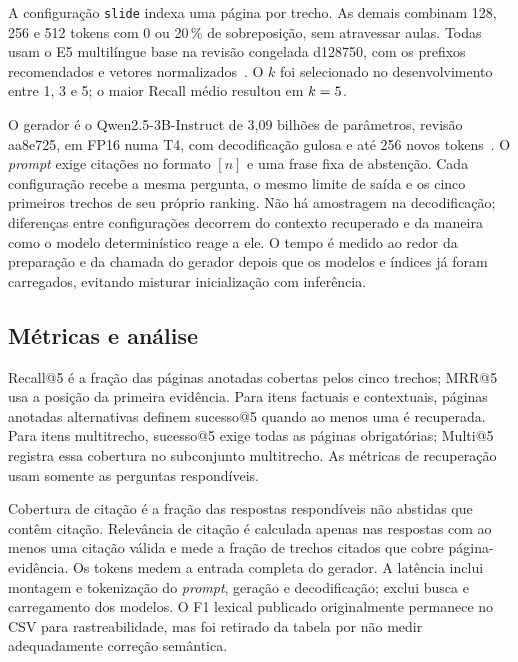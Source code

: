 \documentclass[conference]{IEEEtran}
\begin{document}
A configuração \texttt{slide} indexa uma página por trecho.
As demais combinam 128, 256 e 512 tokens com 0 ou 20\,\% de sobreposição, sem atravessar aulas.
Todas usam o E5 multilíngue base na revisão congelada d128750, com os prefixos recomendados e vetores normalizados~\cite{e5modelcard}.
O $k$ foi selecionado no desenvolvimento entre 1, 3 e 5; o maior Recall médio resultou em $k=5$.

O gerador é o Qwen2.5-3B-Instruct de 3,09 bilhões de parâmetros, revisão aa8e725, em FP16 numa T4, com decodificação gulosa e até 256 novos tokens~\cite{qwen2025qwen25,qwenmodelcard}.
O \textit{prompt} exige citações no formato $[n]$ e uma frase fixa de abstenção.
Cada configuração recebe a mesma pergunta, o mesmo limite de saída e os cinco primeiros trechos de seu próprio ranking.
Não há amostragem na decodificação; diferenças entre configurações decorrem do contexto recuperado e da maneira como o modelo determinístico reage a ele.
O tempo é medido ao redor da preparação e da chamada do gerador depois que os modelos e índices já foram carregados, evitando misturar inicialização com inferência.

\subsection{Métricas e análise}
Recall@5 é a fração das páginas anotadas cobertas pelos cinco trechos; MRR@5 usa a posição da primeira evidência.
Para itens factuais e contextuais, páginas anotadas alternativas definem sucesso@5 quando ao menos uma é recuperada.
Para itens multitrecho, sucesso@5 exige todas as páginas obrigatórias; Multi@5 registra essa cobertura no subconjunto multitrecho.
As métricas de recuperação usam somente as \NRespondiveisTeste{} perguntas respondíveis.

Cobertura de citação é a fração das respostas respondíveis não abstidas que contêm citação.
Relevância de citação é calculada apenas nas respostas com ao menos uma citação válida e mede a fração de trechos citados que cobre página-evidência.
Os tokens medem a entrada completa do gerador.
A latência inclui montagem e tokenização do \textit{prompt}, geração e decodificação; exclui busca e carregamento dos modelos.
O F1 lexical publicado originalmente permanece no CSV para rastreabilidade, mas foi retirado da tabela por não medir adequadamente correção semântica.
\end{document}
